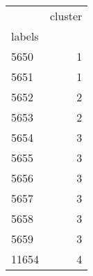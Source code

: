 \begin{tabular}{lr}
\toprule
{} &  cluster \\
labels &          \\
\midrule
5650   &        1 \\
5651   &        1 \\
5652   &        2 \\
5653   &        2 \\
5654   &        3 \\
5655   &        3 \\
5656   &        3 \\
5657   &        3 \\
5658   &        3 \\
5659   &        3 \\
11654  &        4 \\
\bottomrule
\end{tabular}
